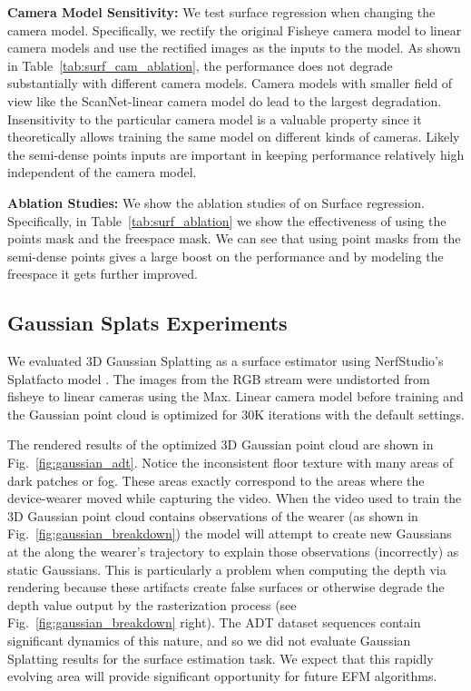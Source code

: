 \noindent\textbf{Camera Model Sensitivity:}
We test \EVL{} surface regression when changing the camera model. Specifically, we rectify the original Fisheye camera model to linear camera models and use the rectified images as the inputs to the \EVL{} model.
As shown in Table~\ref{tab:surf_cam_ablation}, the performance does not degrade substantially with different camera models. Camera models with smaller field of view like the ScanNet-linear camera model do lead to the largest degradation. Insensitivity to the particular camera model is a valuable property since it theoretically allows training the same model on different kinds of cameras. Likely the semi-dense points inputs are important in keeping performance relatively high independent of the camera model.
% 


\noindent\textbf{Ablation Studies:} We show the ablation studies of \EVL{} on Surface regression. Specifically, in Table~\ref{tab:surf_ablation} we show the effectiveness of using the points mask and the freespace mask. We can see that using point masks from the semi-dense points gives a large boost on the performance and by modeling the freespace it gets further improved.

% 


\subsection{Gaussian Splats Experiments}
We evaluated 3D Gaussian Splatting \cite{kerbl3Dgaussians} as a surface estimator  using NerfStudio's Splatfacto model \cite{nerfstudio}. The images from the RGB stream were undistorted from fisheye to linear cameras using the Max. Linear camera model before training and the Gaussian point cloud is optimized for 30K iterations with the default settings. 

The rendered results of the optimized 3D Gaussian point cloud are shown in Fig.~\ref{fig:gaussian_adt}. Notice the inconsistent floor texture with many areas of dark patches or fog. These areas exactly correspond to the areas where the device-wearer moved while capturing the video. When the video used to train the 3D Gaussian point cloud contains observations of the wearer (as shown in Fig.~\ref{fig:gaussian_breakdown}) the model will attempt to create new Gaussians at the along the wearer's trajectory to explain those observations (incorrectly) as static Gaussians. This is particularly a problem when computing the depth via rendering because these artifacts create false surfaces or otherwise degrade the depth value output by the rasterization process (see Fig.~\ref{fig:gaussian_breakdown} right). The ADT dataset sequences contain significant dynamics of this nature, and so we did not evaluate Gaussian Splatting results for the surface estimation task. We expect that this rapidly evolving area will provide significant opportunity for future EFM algorithms.

